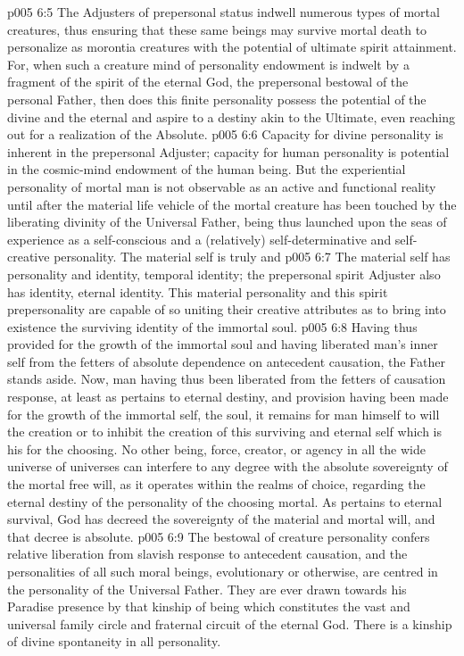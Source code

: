 \vs p005 6:5 \pc The Adjusters of prepersonal status indwell numerous types of mortal creatures, thus ensuring that these same beings may survive mortal death to personalize as morontia creatures with the potential of ultimate spirit attainment. For, when such a creature mind of personality endowment is indwelt by a fragment of the spirit of the eternal God, the prepersonal bestowal of the personal Father, then does this finite personality possess the potential of the divine and the eternal and aspire to a destiny akin to the Ultimate, even reaching out for a realization of the Absolute.
\vs p005 6:6 Capacity for divine personality is inherent in the prepersonal Adjuster; capacity for human personality is potential in the cosmic\hyp{}mind endowment of the human being. But the experiential personality of mortal man is not observable as an active and functional reality until after the material life vehicle of the mortal creature has been touched by the liberating divinity of the Universal Father, being thus launched upon the seas of experience as a self\hyp{}conscious and a (relatively) self\hyp{}determinative and self\hyp{}creative personality. The material self is truly and 
\vs p005 6:7 \pc The material self has personality and identity, temporal identity; the prepersonal spirit Adjuster also has identity, eternal identity. This material personality and this spirit prepersonality are capable of so uniting their creative attributes as to bring into existence the surviving identity of the immortal soul.
\vs p005 6:8 Having thus provided for the growth of the immortal soul and having liberated man’s inner self from the fetters of absolute dependence on antecedent causation, the Father stands aside. Now, man having thus been liberated from the fetters of causation response, at least as pertains to eternal destiny, and provision having been made for the growth of the immortal self, the soul, it remains for man himself to will the creation or to inhibit the creation of this surviving and eternal self which is his for the choosing. No other being, force, creator, or agency in all the wide universe of universes can interfere to any degree with the absolute sovereignty of the mortal free will, as it operates within the realms of choice, regarding the eternal destiny of the personality of the choosing mortal. As pertains to eternal survival, God has decreed the sovereignty of the material and mortal will, and that decree is absolute.
\vs p005 6:9 \pc The bestowal of creature personality confers relative liberation from slavish response to antecedent causation, and the personalities of all such moral beings, evolutionary or otherwise, are centred in the personality of the Universal Father. They are ever drawn towards his Paradise presence by that kinship of being which constitutes the vast and universal family circle and fraternal circuit of the eternal God. There is a kinship of divine spontaneity in all personality.
